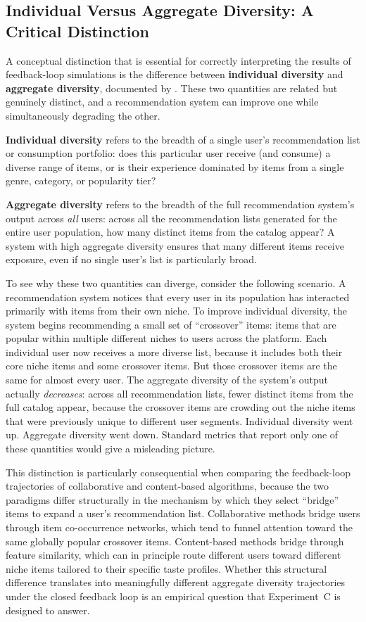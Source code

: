 \documentclass[11pt,a4paper]{report}
\begin{document}
\subsection*{Individual Versus Aggregate Diversity: A Critical Distinction}

A conceptual distinction that is essential for correctly interpreting the results of feedback-loop simulations is the difference between \textbf{individual diversity} and \textbf{aggregate diversity}, documented by \citet{fleder2009blockbuster}. These two quantities are related but genuinely distinct, and a recommendation system can improve one while simultaneously degrading the other.

\textbf{Individual diversity} refers to the breadth of a single user's recommendation list or consumption portfolio: does this particular user receive (and consume) a diverse range of items, or is their experience dominated by items from a single genre, category, or popularity tier?

\textbf{Aggregate diversity} refers to the breadth of the full recommendation system's output across \emph{all} users: across all the recommendation lists generated for the entire user population, how many distinct items from the catalog appear? A system with high aggregate diversity ensures that many different items receive exposure, even if no single user's list is particularly broad.

To see why these two quantities can diverge, consider the following scenario. A recommendation system notices that every user in its population has interacted primarily with items from their own niche. To improve individual diversity, the system begins recommending a small set of ``crossover'' items: items that are popular within multiple different niches to users across the platform. Each individual user now receives a more diverse list, because it includes both their core niche items and some crossover items. But those crossover items are the same for almost every user. The aggregate diversity of the system's output actually \emph{decreases}: across all recommendation lists, fewer distinct items from the full catalog appear, because the crossover items are crowding out the niche items that were previously unique to different user segments. Individual diversity went up. Aggregate diversity went down. Standard metrics that report only one of these quantities would give a misleading picture.

This distinction is particularly consequential when comparing the feedback-loop trajectories of collaborative and content-based algorithms, because the two paradigms differ structurally in the mechanism by which they select ``bridge'' items to expand a user's recommendation list. Collaborative methods bridge users through item co-occurrence networks, which tend to funnel attention toward the same globally popular crossover items. Content-based methods bridge through feature similarity, which can in principle route different users toward different niche items tailored to their specific taste profiles. Whether this structural difference translates into meaningfully different aggregate diversity trajectories under the closed feedback loop is an empirical question that Experiment~C is designed to answer.
\end{document}
